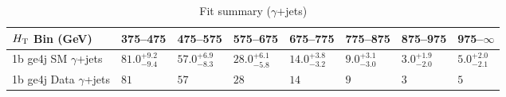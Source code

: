 \documentclass[8pt]{article}
\def\scalht{\mbox{$H_{\rm{T}}$}\xspace}
\newcommand\T{\rule{0pt}{2.6ex}}
\begin{document}
\begin{table}[ht!]
\caption{Fit summary ($\gamma$+jets)}
\label{tab:ensemble-summary}
\centering
\begin{tabular}{ llllllll }

\hline
\scalht Bin (GeV)       & 375--475                       & 475--575                       & 575--675                       & 675--775                       & 775--875                       & 875--975                       & 975--$\infty$                  \\ [1.000000ex]
\hline
1b ge4j SM $\gamma$+jets\T & $81.0^{+9.2}_{-9.4}$           & $57.0^{+6.9}_{-8.3}$           & $28.0^{+6.1}_{-5.8}$           & $14.0^{+3.8}_{-3.2}$           & $9.0^{+3.1}_{-3.0}$            & $3.0^{+1.9}_{-2.0}$            & $5.0^{+2.0}_{-2.1}$            \\ 
1b ge4j Data $\gamma$+jets\T & $81$                           & $57$                           & $28$                           & $14$                           & $9$                            & $3$                            & $5$                            \\ 
\hline

\end{tabular}
\end{table}
\end{document}
